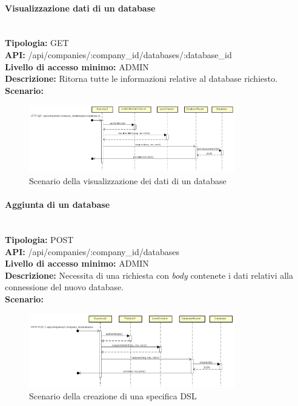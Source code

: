 \newpage
\paragraph{Visualizzazione dati di un database}\mbox{}\\
\textbf{Tipologia:} GET \\
\textbf{API:} /api/companies/:company\_id/databases/:database\_id \\
\textbf{Livello di accesso minimo:} ADMIN \\
\textbf{Descrizione:} Ritorna tutte le informazioni relative al database richiesto. \\
\textbf{Scenario:} 
\begin{figure}[H]
\centering
\includegraphics[width=0.8\textwidth]{res/sections/backend/sequence/(GET)databaseById.png}
\caption{Scenario della visualizzazione dei dati di un database}
\end{figure}

\newpage
\paragraph{Aggiunta di un database}\mbox{}\\
\textbf{Tipologia:} POST \\
\textbf{API:} /api/companies/:company\_id/databases \\
\textbf{Livello di accesso minimo:} ADMIN \\
\textbf{Descrizione:} Necessita di una richiesta con \textit{body} contenete i dati relativi alla connessione del nuovo database. \\
\textbf{Scenario:}
\begin{figure}[H]
\centering
\includegraphics[width=0.8\textwidth]{res/sections/backend/sequence/(POST)database.png}
\caption{Scenario della creazione di una specifica DSL}
\end{figure}

